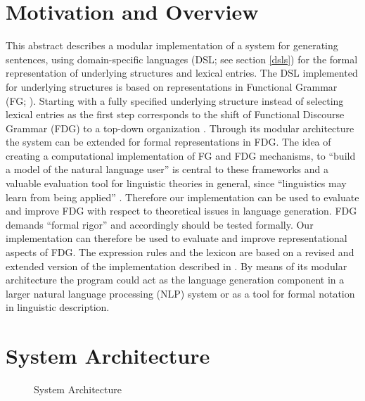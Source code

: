 \documentclass[a4paper, halfparskip, onecolumn, abstracton, final, figurecaptionabove]{scrartcl}
\begin{document}
\section{Motivation and Overview}
This abstract describes a modular implementation of a system for generating sentences, using domain-specific languages (DSL; see section \ref{dsls}) for the formal representation of underlying structures and lexical entries. The DSL implemented for underlying structures is based on representations in Functional Grammar (FG; \citealt{Dik1997a}). Starting with a fully specified underlying structure instead of selecting lexical entries as the first step corresponds to the shift of Functional Discourse Grammar (FDG) to a top-down organization \citep{HengeveldAndMackenzie2006}. Through its modular architecture the system can be extended for formal representations in FDG. The idea of creating a computational implementation of FG and FDG mechanisms, to ``build a model of the natural language user'' \citep[1]{Dik1997a} is central to these frameworks and a valuable evaluation tool for linguistic theories in general, since ``linguistics may learn from being applied'' \citep[4]{Bakker1994}. Therefore our implementation can be used to evaluate and improve FDG with respect to theoretical issues in language generation. FDG demands ``formal rigor'' \citep[668]{HengeveldAndMackenzie2006} and accordingly should be tested formally. Our implementation can therefore be used to evaluate and improve representational aspects of FDG. The expression rules and the lexicon are based on a revised and extended version of the implementation described in \cite{Samuelsdorff1989}. By means of its modular architecture the program could act as the language generation component in a larger natural language processing (NLP) system or as a tool for formal notation in linguistic description.

\section{System Architecture}

\begin{figure}
\begin{center}
\end{center}
\caption{System Architecture} \label{sysflow}
\end{figure}
\end{document}
